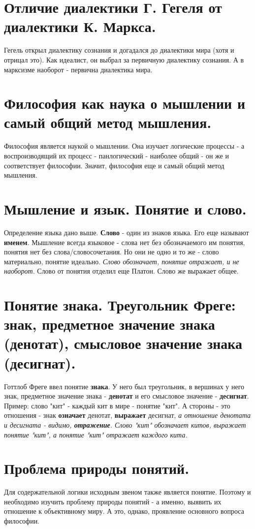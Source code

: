 \section{ Отличие диалектики Г. Гегеля от диалектики К. Маркса.}
Гегель открыл диалектику сознания и догадался до диалектики мира (хотя и отрицал это). Как идеалист, он выбрал за первичную диалектику сознания. А в марксизме наоборот - первична диалектика мира.

\section{ Философия как наука о мышлении и самый общий метод мышления.}
Философия является наукой о мышлении. Она изучает логические процессы - а воспроизводящий их процесс - панлогический - наиболее общий  - он же и соответствует философии. Значит, философия еще и самый общий метод мышления.

\section{ Мышление и язык. Понятие и слово.}
Определение языка дано выше. \textbf{Слово} - один из знаков языка. Его еще называют \textbf{именем}.  
Мышление всегда языковое - слова нет без обозначаемого им понятия, понятия нет без слова/словосочетания. Но они не одно и то же - слово материально, понятие идеально. \textit{Слово обозначает, понятие отражает, и не наоборот}. Слово от понятия отделил еще Платон.  Слово же выражает общее.

\section{ Понятие знака. Треугольник Фреге: знак, предметное значение знака (денотат), смысловое значение знака (десигнат).}
Готтлоб Фреге ввел понятие \textbf{знака}. У него был треугольник, в вершинах у него знак, предметное значение знака - \textbf{денотат} и его смысловое значение - \textbf{десигнат}. Пример: слово "кит" - каждый кит в мире - понятие "кит". А стороны - это отношения - знак \textbf{означает} денотат, \textbf{выражает} десигнат, \textit{а отношение денотата и десигната  - видимо, \textbf{отражение}. Слово "кит" обозначает китов, выражает понятие "кит", а понятие "кит" отражает каждого кита.}

\section{ Проблема природы понятий.}
Для содержательной логики исходным звеном также является понятие. Поэтому и необходимо изучить проблему природы понятий - а именно, выявить их отношение к объективному миру. А это, однако, проявление основного вопроса философии. 


